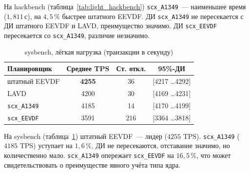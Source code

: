 \documentclass[14pt, oneside]{extbook}
\begin{document}
        На hackbench (таблица~\ref{tab:light_hackbench})
        \texttt{scx\_A1349}~--- наименьшее время ($1{,}811$\,с),
        на $4{,}5$\,\% быстрее штатного EEVDF. ДИ
        \texttt{scx\_A1349} не пересекается с ДИ штатного EEVDF
        и LAVD, преимущество значимо. ДИ \texttt{scx\_EEVDF}
        пересекается со \texttt{scx\_A1349}, различие незначимо.

        \begin{table}[H]
                \centering
                \caption{sysbench, лёгкая нагрузка (транзакции в секунду)}
                \label{tab:light_sysbench}
                \vspace{0.4em}
                \begin{tabular}{|l|c|c|c|}
                        \hline
                        Планировщик & Среднее TPS & Ст. откл. & 95\%-ДИ \\
                        \hline
                        штатный EEVDF & \textbf{4255} & 36 & [4217 \dots 4292] \\
                        LAVD & 4200 & 30 & [4169 \dots 4231] \\
                        \texttt{scx\_A1349} & 4185 & 14 & [4170 \dots 4199] \\
                        \texttt{scx\_EEVDF} & 3591 & 216 & [3364 \dots 3818] \\
                        \hline
                \end{tabular}
        \end{table}

        На sysbench (таблица~\ref{tab:light_sysbench})
        штатный EEVDF~--- лидер ($4255$ TPS).
        \texttt{scx\_A1349} ($4185$ TPS) уступает на
        $1{,}6$\,\%, ДИ не пересекаются, отставание значимо,
        но количественно мало. \texttt{scx\_A1349} опережает
        \texttt{scx\_EEVDF} на $16{,}5$\,\%, что может
        свидетельствовать о преимуществе явного учёта типа
        ядра.
\end{document}
